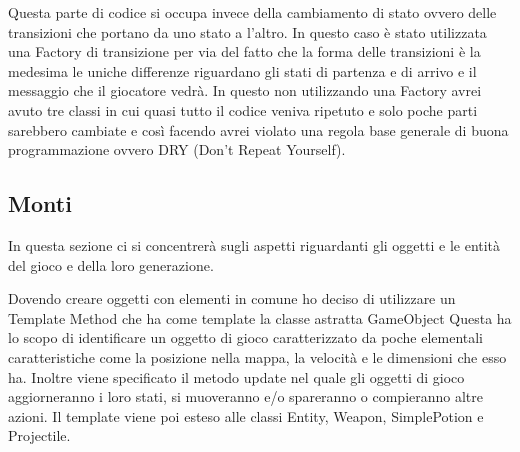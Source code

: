 \documentclass[a4paper,12pt]{report}
\begin{document}
    \par Questa parte di codice si occupa invece della cambiamento di stato ovvero delle transizioni che portano da uno stato
    a l’altro. In questo caso è stato utilizzata una Factory di transizione per via del fatto che la forma delle transizioni
    è la medesima  le uniche differenze riguardano gli stati di partenza e di arrivo e il messaggio che il giocatore vedrà.
    In questo non utilizzando una Factory avrei avuto tre classi in cui quasi tutto il codice veniva ripetuto e solo poche
    parti sarebbero cambiate  e così facendo avrei violato una regola base generale di buona programmazione ovvero
    DRY (Don’t Repeat Yourself).

    \subsection{Monti}
    \par In questa sezione ci si concentrerà sugli aspetti riguardanti gli oggetti e le entità del gioco e della loro generazione.
    \par Dovendo creare oggetti con elementi in comune ho deciso di utilizzare un Template Method che ha come template la classe astratta GameObject
    Questa ha lo scopo di identificare un oggetto di gioco caratterizzato da poche elementali caratteristiche come la posizione nella mappa, la velocità e
    le dimensioni che esso ha.
    Inoltre viene specificato il metodo update nel quale gli oggetti di gioco aggiorneranno i loro stati, si muoveranno e/o spareranno o compieranno
    altre azioni.
    Il template viene poi esteso alle classi Entity, Weapon, SimplePotion e Projectile.
    \\
    \par
\end{document}
